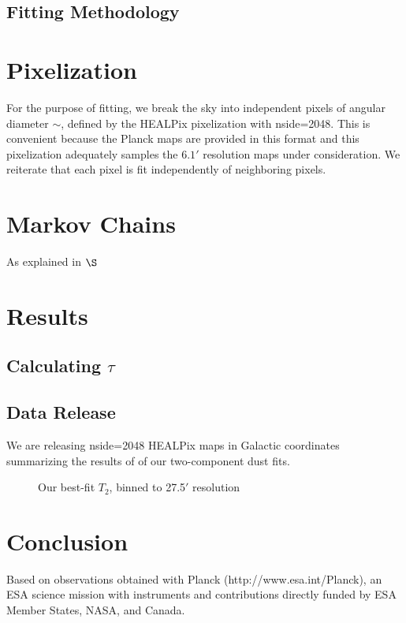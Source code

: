 \documentclass{emulateapj}
\begin{document}
\subsection{Fitting Methodology}

\section{Pixelization}
For the purpose of fitting, we break the sky into independent pixels of 
angular diameter $\sim$, defined by the HEALPix pixelization with nside=2048. 
This is convenient because the Planck maps are provided in this format and 
this pixelization adequately samples the $6.1'$ resolution maps under 
consideration. We reiterate that each pixel is fit independently of 
neighboring pixels.

\section{Markov Chains}
As explained in $\S$ %

\section{Results}

\subsection{Calculating $\tau$}

\subsection{Data Release}
We are releasing nside=2048 HEALPix maps in Galactic coordinates summarizing 
the results of of our two-component dust fits. 

\begin{figure*}
\begin{center}
\caption{Our best-fit $T_2$, binned to 27.5$'$ resolution}
\end{center}
\end{figure*}

\section{Conclusion}

Based on observations obtained with Planck (http://www.esa.int/Planck), 
an ESA science mission with instruments and contributions directly funded 
by ESA Member States, NASA, and Canada.



\end{document}
